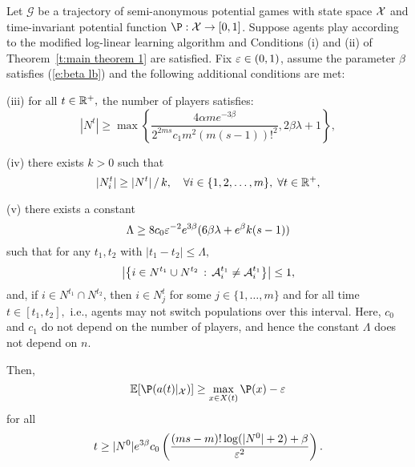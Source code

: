 \begin{Theorem}\label{t:main theorem 2}
Let $\mathcal{G}$ be a trajectory of semi-anonymous potential games with state space ${\mathcal X}$ and time-invariant potential function $\P:\X\to [0,1]$.
Suppose agents play according to the modified log-linear learning algorithm and Conditions (i) and (ii) of Theorem~\ref{t:main theorem 1} are satisfied. Fix $\varepsilon\in (0,1)$, assume the parameter $\beta$ satisfies (\ref{e:beta lb}) and the following additional conditions are met:

\noindent(iii) for all $t\in \mathbb{R}^+,$ the number of players satisfies: 
\begin{equation}\label{e:num players}
|N^t| \geq \max\left\{\frac{4\alpha m e^{-3\beta}}{2^{2ms}c_1m^2(m(s-1))!^2},2\beta\lambda+1   \right\},
\end{equation}


\noindent(iv) there exists $k>0$ such that
\begin{equation}\label{e:pop sizes}
|N_i^t| \geq |N^t|\mathop{/} k,\quad \forall i\in \{1,2,\ldots,m\},\;\forall t\in\mathbb{R}^+,
\end{equation}

\smallskip

\noindent (v) there exists a constant
\begin{equation}\label{e:lambda}
\Lambda\geq 8c_0\eps^{-2}e^{3\beta}(6\beta\lambda+e^\beta k(s-1))
%
\end{equation}
such that for any $t_1,t_2$ with $|t_1 - t_2|\leq \Lambda,$
\begin{equation}
\left|\left\{i\in N^{t_1} \cup N^{t_2} \,:\, \mathcal{A}_i^{t_1}\neq \mathcal{A}_i^{t_1}\right\}\right|\leq 1,
\end{equation}
and, if $ i \in N^{t_1} \cap N^{t_2}$, then $ i \in N_j^t$ for some $j \in \{1, \dots, m\}$ and for all time $t \in [t_1, t_2],$ i.e., agents may not switch populations over this interval.
%
Here, $c_0$ and $c_1$ do not depend on the number of players, and hence the constant $\Lambda$ does not depend on $n$.
%
%
\smallskip

\noindent Then,
\begin{equation}\label{e:expot}
\E[\P(a(t)|_{\X})]\geq \max_{x\in X(t)}\P(x) - \eps
\end{equation}
for all 
\begin{equation}\label{e:t ub}
t\geq |N^0| e^{3\beta}c_0\left({(ms-m)!\log(|N^0|+2)+\beta\over\varepsilon^2}\right).
\end{equation}
\end{Theorem}


